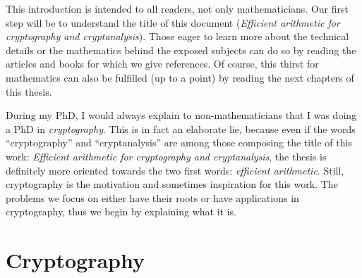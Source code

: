 This introduction is intended to all readers, not only mathematicians. Our first
step will be to understand the title of this document (\emph{Efficient
arithmetic for cryptography and cryptanalysis}). Those eager to learn more about
the technical details or the mathematics behind the
exposed subjects can do so by reading the articles and books for which we give
references. Of course, this thirst for mathematics can also be fulfilled (up to
a point) by reading the next chapters of this thesis.

\minitoc
%
\clearpage

During my PhD, I would always explain to non-mathematicians that I was doing a
PhD in \emph{cryptography}. This is in fact an elaborate lie, because even if
the words ``cryptography'' and ``cryptanalysis'' are among those composing
the title of this work: \emph{Efficient arithmetic for cryptography and
cryptanalysis}, the thesis is definitely more oriented towards the two first
words: \emph{efficient arithmetic}. Still, cryptography is the motivation and
sometimes inspiration for this work. The problems we focus on either have their
roots or have applications in cryptography, thus we begin by explaining what it
is.

\section{Cryptography}
\label{sec:crypto}

